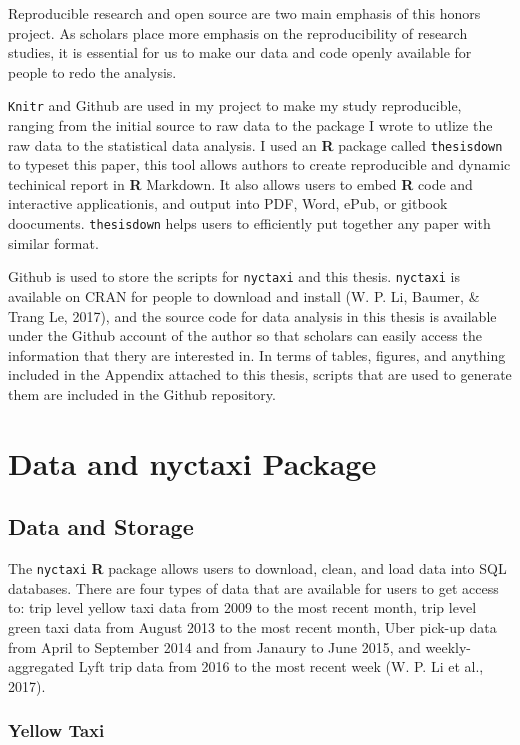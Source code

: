 \documentclass[12pt,twoside]{reedthesis}
\theoremstyle{definition}
\theoremstyle{definition}
\theoremstyle{definition}
\theoremstyle{remark}
\begin{document}
Reproducible research and open source are two main emphasis of this
honors project. As scholars place more emphasis on the reproducibility
of research studies, it is essential for us to make our data and code
openly available for people to redo the analysis.

\texttt{Knitr} and Github are used in my project to make my study
reproducible, ranging from the initial source to raw data to the package
I wrote to utlize the raw data to the statistical data analysis. I used
an \textbf{R} package called \texttt{thesisdown} to typeset this paper,
this tool allows authors to create reproducible and dynamic techinical
report in \textbf{R} Markdown. It also allows users to embed \textbf{R}
code and interactive applicationis, and output into PDF, Word, ePub, or
gitbook doocuments. \texttt{thesisdown} helps users to efficiently put
together any paper with similar format.

Github is used to store the scripts for \texttt{nyctaxi} and this
thesis. \texttt{nyctaxi} is available on CRAN for people to download and
install (W. P. Li, Baumer, \& Trang Le, 2017), and the source code for
data analysis in this thesis is available under the Github account of
the author so that scholars can easily access the information that thery
are interested in. In terms of tables, figures, and anything included in
the Appendix attached to this thesis, scripts that are used to generate
them are included in the Github repository.

\chapter{Data and nyctaxi Package}\label{chapter2}

\section{Data and Storage}\label{data-and-storage}

The \texttt{nyctaxi} \textbf{R} package allows users to download, clean,
and load data into SQL databases. There are four types of data that are
available for users to get access to: trip level yellow taxi data from
2009 to the most recent month, trip level green taxi data from August
2013 to the most recent month, Uber pick-up data from April to September
2014 and from Janaury to June 2015, and weekly-aggregated Lyft trip data
from 2016 to the most recent week (W. P. Li et al., 2017).

\subsection{Yellow Taxi}\label{yellow-taxi-1}
\end{document}
